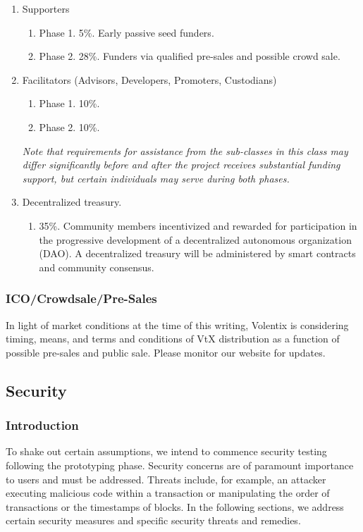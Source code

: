 \documentclass[]{article}
\begin{document}
{\begin{enumerate}
	\item Supporters\
	\begin{enumerate}
		\item Phase 1. 5\%. Early passive seed funders.
		\item Phase 2. 28\%. Funders via qualified pre-sales and possible crowd sale.  
	\end{enumerate}
	\item {Facilitators} 
	(Advisors, Developers, Promoters, Custodians)\
	\begin{enumerate}
		\item Phase 1. 10\%. 
		\item Phase 2. 10\%. \
	\end{enumerate}
	\textit{Note that requirements for assistance from the sub-classes in this class may differ significantly before and after the project receives substantial funding support, but certain individuals may serve during both phases. }
	\item Decentralized treasury. 
	\begin{enumerate}
		\item 35\%. Community members incentivized and rewarded for participation in the progressive development of a decentralized autonomous organization (DAO). A decentralized treasury will be administered by smart contracts and community consensus.
		
	\end{enumerate}
	
	
	
\end{enumerate}

\subsubsection {ICO/Crowdsale/Pre-Sales}

In light of market conditions at the time of this writing, Volentix is considering timing, means, and terms and conditions of VtX distribution as a function of possible pre-sales and public sale. Please monitor our website for updates. 


\subsection{Security}
\subsubsection{Introduction}
To shake out certain assumptions, we intend to commence security testing following the prototyping phase.
Security concerns are of paramount importance to users and must be addressed. 
Threats include, for example, an attacker executing malicious code within a transaction or manipulating the order of transactions or the timestamps of blocks. In the following sections, 
we address certain security measures and specific security threats and remedies. 
}
\end{document}
